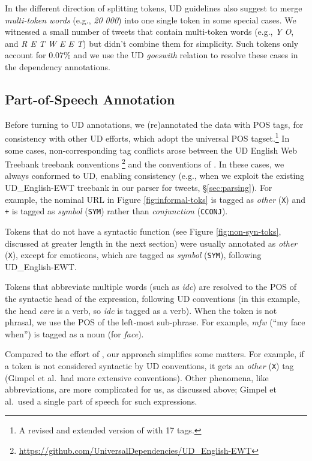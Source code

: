 \documentclass[11pt,a4paper]{article}
\begin{document}
In the different direction of splitting tokens, UD guidelines also suggest to merge
{\it multi-token words} (e.g., {\it 20 000}) into one single token in some special
cases. We witnessed a small number of tweets that contain multi-token words
(e.g., {\it Y O}, and {\it R E T W E E T}) but didn't combine them for simplicity.
Such tokens only account for 0.07\% and we use the UD
  {\it goeswith} relation to resolve these cases in the dependency annotations.

\subsection{Part-of-Speech Annotation}\label{sec:pos-anno}

Before turning to UD annotations, we (re)annotated the data with 
POS tags, for consistency with other UD efforts,
which adopt the universal POS tagset.\footnote{A revised and extended version of \citet{PETROV12.274} with 17 tags.}
In some cases,  non-corresponding tag conflicts arose between the UD English Web Treebank 
treebank conventions \cite[UD\_English-EWT;][]{Marneffe2014UniversalSD}\footnote{\url{https://github.com/UniversalDependencies/UD_English-EWT}}
and the conventions of .  In these cases, we always
conformed to UD, enabling consistency (e.g., when we exploit the
existing UD\_English-EWT treebank in our parser for tweets, \S\ref{sec:parsing}).  For example,  
the nominal URL in Figure \ref{fig:informal-toks} is tagged as {\it
  other} ({\tt X}) and {\tt +} is tagged as {\it symbol} ({\tt SYM})
rather than {\it conjunction} ({\tt CCONJ}).  


Tokens that do not have a syntactic function (see Figure \ref{fig:non-syn-toks}, discussed at greater
length in the next section) were usually annotated as \emph{other}
(\texttt{X}), except for emoticons, which are tagged as \emph{symbol}
(\texttt{SYM}), following UD\_English-EWT.





Tokens that abbreviate multiple words (such as \emph{idc}) are resolved to the POS of the syntactic head of the
expression, following UD conventions (in this example, the head \emph{care} is
a verb, so \emph{idc} is tagged as a verb).
When the token is not phrasal, we use the POS of the left-most
sub-phrase.  For example, \emph{mfw} (``my face when'') is tagged as a
noun (for \emph{face}).  



Compared to the effort of
, our approach simplifies some
matters.  For example, if a token is not considered syntactic by UD
conventions, it gets an \emph{other} (\texttt{X}) tag (Gimpel et
al.~had more extensive conventions).  Other phenomena, like
abbreviations, are more complicated for us, as discussed above;
Gimpel et al.~used a single part of speech for such expressions.
\end{document}
